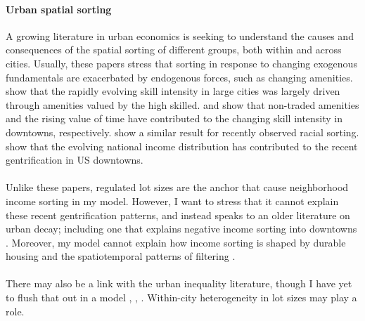 \documentclass[]{article}
\begin{document}
\paragraph*{Urban spatial sorting} A growing literature in urban economics is seeking to understand the causes and consequences of the spatial sorting of different groups, both within and across cities. Usually, these papers stress that sorting in response to changing exogenous fundamentals are exacerbated by endogenous forces, such as changing amenities. \cite{diamond2016} show that the rapidly evolving skill intensity in large cities was largely driven through amenities valued by the high skilled. \cite{couturehandbury} and \cite{su2021} show that non-traded amenities and the rising value of time have contributed to the changing skill intensity in downtowns, respectively. \cite{bshartley2020} show a similar result for recently observed racial sorting. \cite{Coutureetal} show that the evolving national income distribution has contributed to the recent gentrification in US downtowns.

\paragraph*{}
Unlike these papers, regulated lot sizes are the anchor that cause neighborhood income sorting in my model. However, I want to stress that it cannot explain these recent gentrification patterns, and instead speaks to an older literature on urban decay; including one that explains negative income sorting into downtowns \citep{parispoor} \citep{ccpoortransport}. Moreover, my model cannot explain how income sorting is shaped by durable housing and the spatiotemporal patterns of filtering \citep{Gentrificationcycles}. 

\paragraph*{}
There may also be a link with the urban inequality literature, though I have yet to flush that out in a model \citep{ineqcitysize}, \citep{spatialsorting}, \citep{FogliGuerrieri}. Within-city heterogeneity in lot sizes may play a role.
\end{document}
